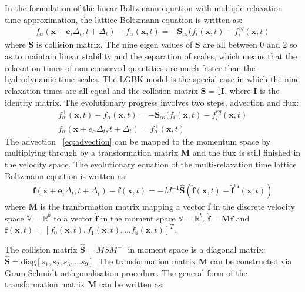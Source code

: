 In the formulation of the linear Boltzmann equation with multiple relaxation time approximation, the lattice Boltzmann equation is written as:
\begin{align}
f_{\alpha}(\mathbf{x}+\mathbf{e}_i\Delta_t, t+ \Delta_t)-f_{\alpha}(\mathbf{x},t)=-\mathbf{S}_{\alpha i}(f_i(\mathbf{x},t)-f_i^{eq}(\mathbf{x},t)
\end{align}
\flushleft where \textbf{S} is collision matrix. The nine eigen values of \textbf{S} are all between 0 and 2 so as to maintain linear stability and the separation of scales, which means that the relaxation times of non-conserved quantities are much faster than the hydrodynamic time scales. The LGBK model is the special case in which the nine relaxation times are all equal and the collision matrix $\mathbf{S}=\frac{1}{\tau}\mathbf{I}$, where \textbf{I} is the identity matrix. The evolutionary progress involves two steps, advection and flux:
\begin{align}
f_{\alpha}^+(\mathbf{x},t)-f_{\alpha}(\mathbf{x},t) = - \mathbf{S}_{\alpha i}(f_i(\mathbf{x},t)-f_i^{eq}(\mathbf{x},t) \label{eq:advection}\\
f_{\alpha}(\mathbf{x}+e_{\alpha}\Delta_t, t+\Delta_t)=f_{\alpha}^+(\mathbf{x},t)
\end{align}
\flushleft The advection ~\cref{eq:advection} can be mapped to the momentum space by multiplying through by a transformation matrix \textbf{M} and the flux is still finished in the velocity space. The evolutionary equation of the multi-relaxation time lattice Boltzmann equation is written as:
\begin{align}
\mathbf{f}(\mathbf{x}+\mathbf{e}_i\Delta_t, t+ \Delta_t)-\mathbf{f}(\mathbf{x},t)=-M^{-1}\hat{\mathbf{S}}(\hat{\mathbf{f}}(\mathbf{x},t)-\hat{\mathbf{f}}^{eq}(\mathbf{x},t))
\end{align}
\flushleft where \textbf{M} is the tranformation matrix mapping a vector \textbf{f} in the discrete velocity space $\mathds{V}=\mathds{R}^b$ to a vector $\hat{\mathbf{f}}$ in the moment space $\mathds{V}=\mathds{R}^b$. 
$\hat{\mathbf{f}}= \mathbf{M}\mathbf{f}$ and 
$\mathbf{f}(\mathbf{x},t) =\left[f_0(\mathbf{x},t),f_1(\mathbf{x},t),\dots f_8(\mathbf{x},t)\right]^T$. 

The collision matrix $\hat{\mathbf{S}} = MSM^{-1}$ in moment space is a diagonal matrix: $\hat{\mathbf{S}} =\mbox{diag} \left[ s_1, s_2, s_3,\dots s_9  \right]$. The transformation matrix \textbf{M} can be constructed via Gram-Schmidt orthgonalisation procedure. The general form of the transformation matrix \textbf{M} can be written as:

